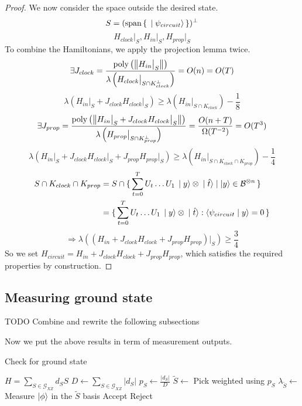 \begin{proof}
We now consider the space outside the desired state.
$$S=(\operatorname*{\operatorname{span}}\set{\ket{\psi_{circuit}}})^\bot$$
$$H_{clock}\big|_S,H_{in}\big|_S,H_{prop}\big|_S$$
To combine the Hamiltonians, we apply the projection lemma twice.
$$\exists J_{clock}
=\frac{\operatorname*{\operatorname{poly}}\left(\left\lVert H_{in}\big|_S\right\rVert\right)}{\lambda\left(H_{clock}\big|_{S\cap K^\bot_{clock}}\right)}
=O(n)=O(T)$$
$$\lambda(H_{in}\big|_S+J_{clock}H_{clock}\big|_S)\geq
\lambda(H_{in}\big|_{S\cap K_{clock}})-\frac{1}{8}$$
$$\exists J_{prop}=\frac{\operatorname*{\operatorname{poly}}\left(\left\lVert H_{in}\big|_S+J_{clock}H_{clock}\big|_S\right\rVert\right)}{\lambda\left(H_{prop}\big|_{S\cap K^\bot_{prop}}\right)}
=\frac{O(n+T)}{\Omega(T^{-2})}=O(T^3)$$
$$\lambda(H_{in}\big|_S+J_{clock}H_{clock}\big|_S+J_{prop}H_{prop}\big|_S)\geq
\lambda(H_{in}\big|_{S\cap K_{clock}\cap K_{prop}})-\frac{1}{4}$$
\begin{align*}
	S\cap K_{clock}\cap K_{prop}&=S\cap\set{\sum_{t=0}^TU_t\ldots U_1\ket{y}\otimes\ket{\hat{t}}|\ket{y}\in\mathcal{B}^{\otimes n}}\\
	&=\set{\sum_{t=0}^TU_t\ldots U_1\ket{y}\otimes\ket{\hat{t}}:\braket{\psi_{circuit}|y}=0}
\end{align*}
$$\Rightarrow\lambda((H_{in}+J_{clock}H_{clock}+J_{prop}H_{prop})\big|_S)\geq\frac{3}{4}$$
So we set $H_{circuit}=H_{in}+J_{clock}H_{clock}+J_{prop}H_{prop}$, which satisfies the required properties by construction.
\end{proof}

\subsection{Measuring ground state}

TODO Combine and rewrite the following subsections

Now we put the above results in term of measurement outputs.

\begin{algorithm}
	\caption{Check for ground state}
	\label{AlgGroundStateCheck}
	\begin{algorithmic}[1]
		\Require $H=\sum_{S\in\mathcal{G}_{XZ}} d_S S$
		\State $D\gets\sum_{S\in\mathcal{G}_{XZ}}|d_S|$
		\State $p_S\gets\frac{|d_S|}{D}$
		\State $\widetilde{S}\gets$ Pick weighted using $p_S$
		\State $\lambda_{\widetilde{S}}\gets$ Measure $\ket\phi$ in the $\widetilde{S}$ basis
		\State Accept
		\Else
		\State Reject
		\EndIf
		\EndProcedure
	\end{algorithmic}
\end{algorithm}

